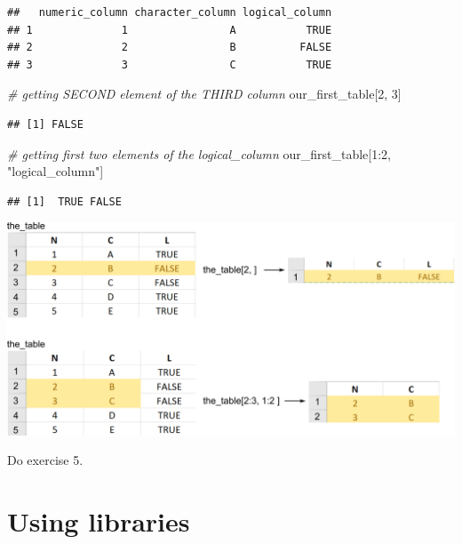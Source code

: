 \documentclass[
]{book}
\newenvironment{Shaded}{\begin{snugshade}}{\end{snugshade}}
\newcommand{\CommentTok}[1]{\textcolor[rgb]{0.56,0.35,0.01}{\textit{#1}}}
\newcommand{\DecValTok}[1]{\textcolor[rgb]{0.00,0.00,0.81}{#1}}
\newcommand{\NormalTok}[1]{#1}
\newcommand{\SpecialCharTok}[1]{\textcolor[rgb]{0.00,0.00,0.00}{#1}}
\newcommand{\StringTok}[1]{\textcolor[rgb]{0.31,0.60,0.02}{#1}}
\begin{document}
\begin{verbatim}
##   numeric_column character_column logical_column
## 1              1                A           TRUE
## 2              2                B          FALSE
## 3              3                C           TRUE
\end{verbatim}

\begin{Shaded}
\begin{Highlighting}[]
\CommentTok{\# getting SECOND element of the THIRD column}
\NormalTok{our\_first\_table[}\DecValTok{2}\NormalTok{, }\DecValTok{3}\NormalTok{]}
\end{Highlighting}
\end{Shaded}

\begin{verbatim}
## [1] FALSE
\end{verbatim}

\begin{Shaded}
\begin{Highlighting}[]
\CommentTok{\# getting first two elements of the logical\_column}
\NormalTok{our\_first\_table[}\DecValTok{1}\SpecialCharTok{:}\DecValTok{2}\NormalTok{, }\StringTok{"logical\_column"}\NormalTok{]}
\end{Highlighting}
\end{Shaded}

\begin{verbatim}
## [1]  TRUE FALSE
\end{verbatim}

\begin{center}\includegraphics[width=1\linewidth]{images/table-rows-columns} \end{center}

Do exercise 5.

\hypertarget{library}{%
\section{Using libraries}\label{library}}
\end{document}
